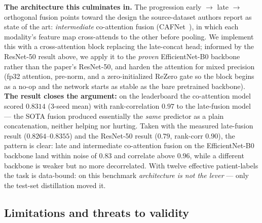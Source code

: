 \documentclass[conference]{IEEEtran}
\begin{document}
\textbf{The architecture this culminates in.} The progression early $\rightarrow$ late $\rightarrow$ orthogonal fusion points toward the design the source-dataset authors report as state of the art: \emph{intermediate} co-attention fusion (CAFNet~\cite{lian2024cafnet}), in which each modality's feature map cross-attends to the other before pooling. We implement this with a cross-attention block replacing the late-concat head; informed by the ResNet-50 result above, we apply it to the \emph{proven} EfficientNet-B0 backbone rather than the paper's ResNet-50, and harden the attention for mixed precision (fp32 attention, pre-norm, and a zero-initialized ReZero gate so the block begins as a no-op and the network starts as stable as the bare pretrained backbone). \textbf{The result closes the argument:} on the leaderboard the co-attention model scored $0.8314$ (3-seed mean) with rank-correlation $0.97$ to the late-fusion model --- the SOTA fusion produced essentially the \emph{same} predictor as a plain concatenation, neither helping nor hurting. Taken with the measured late-fusion result ($0.8264$--$0.8355$) and the ResNet-50 result ($0.79$, rank-corr $0.90$), the pattern is clear: late and intermediate co-attention fusion on the EfficientNet-B0 backbone land within noise of $0.83$ and correlate above $0.96$, while a different backbone is weaker but no more decorrelated. With twelve effective patient-labels the task is data-bound: on this benchmark \emph{architecture is not the lever} --- only the test-set distillation moved it.

\subsection{Limitations and threats to validity}
\end{document}
